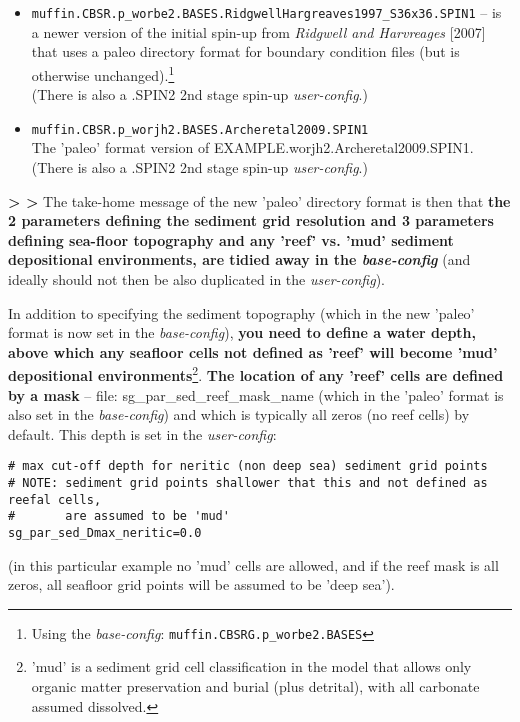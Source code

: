 \begin{enumerate}[noitemsep]
\begin{itemize}[noitemsep]
\vspace{1mm}
\item \texttt{muffin.CBSR.p\_worbe2.BASES.RidgwellHargreaves1997\_S36x36.SPIN1}
-- is a newer version of the initial spin-up from \textit{Ridgwell and Harvreages} [2007] that uses a paleo directory format for boundary condition files (but is otherwise unchanged).\footnote{Using the \textit{base-config}: \texttt{muffin.CBSRG.p\_worbe2.BASES}}
\\(There is also a \textsf{\footnotesize *.SPIN2} 2nd stage spin-up \textit{user-config}.)
\vspace{1mm}
\item \texttt{muffin.CBSR.p\_worjh2.BASES.Archeretal2009.SPIN1}
\\The 'paleo' format version of \textsf{\footnotesize EXAMPLE.worjh2.Archeretal2009.SPIN1}.
\\(There is also a \textsf{\footnotesize *.SPIN2} 2nd stage spin-up \textit{user-config}.)
\end{itemize}

\vspace{1mm}
\textbf{> >} The take-home message of the new 'paleo' directory format is then that \textbf{the 2 parameters defining the sediment grid resolution and 3 parameters defining sea-floor topography and any 'reef' vs. 'mud' sediment depositional environments, are tidied away in the \textit{base-config}} (and ideally should not then be also duplicated in the \textit{user-config}).

\newpage

In addition to specifying the sediment topography (which in the new 'paleo' format is now set in the \textit{base-config}), \textbf{you need to define a water depth, above which any seafloor cells not defined as 'reef' will become 'mud' depositional environments}\footnote{'mud' is a sediment grid cell classification in the model that allows only organic matter preservation and burial (plus detrital), with all carbonate assumed dissolved.}.  \textbf{The location of any 'reef' cells are defined by a mask} --  file: \textsf{\footnotesize sg\_par\_sed\_reef\_mask\_name} (which in the  'paleo' format is also set in the \textit{base-config}) and which is typically all zeros (no reef cells) by default. This depth is set in the \textit{user-config}:
\vspace{-1mm}\small\begin{verbatim}
# max cut-off depth for neritic (non deep sea) sediment grid points
# NOTE: sediment grid points shallower that this and not defined as reefal cells,
#       are assumed to be 'mud'
sg_par_sed_Dmax_neritic=0.0
\end{verbatim}\normalsize\vspace{-1mm}
(in this particular example no 'mud' cells are allowed, and if the reef mask is all zeros, all seafloor grid points will be assumed to be 'deep sea').


\end{enumerate}
